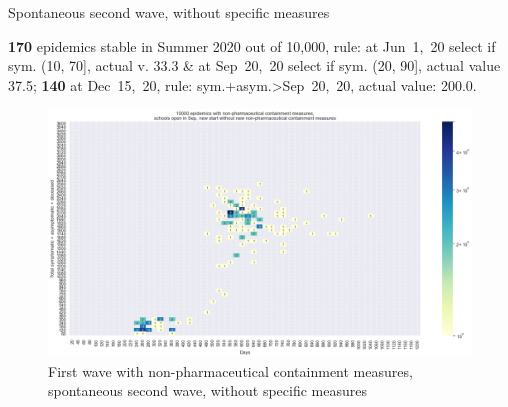 \documentclass[9pt]{beamer}
\begin{document}
\begin{frame}{Spontaneous second wave, without specific measures}


\textbf{170} {\tiny epidemics stable in Summer 2020 out of 10,000, rule: at Jun~1,~20 select if sym. (10, 70], actual v. 33.3 \& at Sep~20,~20 select if sym. (20, 90], actual value 37.5;} \textbf{140} {\tiny at Dec~15,~20, rule: sym.+asym.>Sep~20,~20, actual value: 200.0.}

\begin{figure}[H]
\center
\includegraphics[scale=0.17]{10kSpontWave2.png}
\caption{First wave with non-pharmaceutical containment measures, spontaneous second wave, without specific measures}
\label{selSpontWave2}
\end{figure}



\end{frame}
\end{document}
